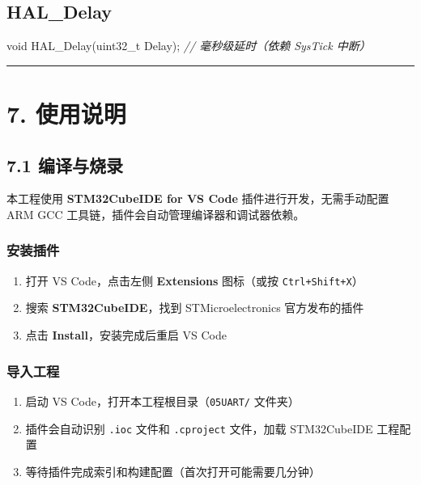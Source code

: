 \documentclass[
  chinese,
  UTF8,
  oneside,
  openany]{ctexbook}
\newenvironment{Shaded}{}{}
\newcommand{\CommentTok}[1]{\textcolor[rgb]{0.38,0.63,0.69}{\textit{#1}}}
\newcommand{\DataTypeTok}[1]{\textcolor[rgb]{0.56,0.13,0.00}{#1}}
\newcommand{\NormalTok}[1]{#1}
\newcommand{\OperatorTok}[1]{\textcolor[rgb]{0.40,0.40,0.40}{#1}}
\providecommand{\tightlist}{%
  \setlength{\itemsep}{0pt}\setlength{\parskip}{0pt}}
\begin{document}
\subsection{HAL\_Delay}\label{hal_delay-1}

\begin{Shaded}
\begin{Highlighting}[]
\DataTypeTok{void}\NormalTok{ HAL\_Delay}\OperatorTok{(}\DataTypeTok{uint32\_t}\NormalTok{ Delay}\OperatorTok{);}  \CommentTok{// 毫秒级延时（依赖 SysTick 中断）}
\end{Highlighting}
\end{Shaded}

\begin{center}\rule{0.5\linewidth}{0.5pt}\end{center}

\section{7. 使用说明}\label{ux4f7fux7528ux8bf4ux660e}

\subsection{7.1 编译与烧录}\label{ux7f16ux8bd1ux4e0eux70e7ux5f55}

本工程使用 \textbf{STM32CubeIDE for VS Code} 插件进行开发，无需手动配置
ARM GCC 工具链，插件会自动管理编译器和调试器依赖。

\subsubsection{安装插件}\label{ux5b89ux88c5ux63d2ux4ef6}

\begin{enumerate}
\def\labelenumi{\arabic{enumi}.}
\tightlist
\item
  打开 VS Code，点击左侧 \textbf{Extensions} 图标（或按
  \texttt{Ctrl+Shift+X}）
\item
  搜索 \textbf{STM32CubeIDE}，找到 STMicroelectronics 官方发布的插件
\item
  点击 \textbf{Install}，安装完成后重启 VS Code
\end{enumerate}

\subsubsection{导入工程}\label{ux5bfcux5165ux5de5ux7a0b}

\begin{enumerate}
\def\labelenumi{\arabic{enumi}.}
\tightlist
\item
  启动 VS Code，打开本工程根目录（\texttt{05UART/} 文件夹）
\item
  插件会自动识别 \texttt{.ioc} 文件和 \texttt{.cproject} 文件，加载
  STM32CubeIDE 工程配置
\item
  等待插件完成索引和构建配置（首次打开可能需要几分钟）
\end{enumerate}
\end{document}
